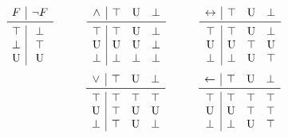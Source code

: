 \begin{table}  
\[
\begin{array}{@{\hspace{1.5mm}}c|c}
F & \neg F\\ \midrule
\top & \bot \\
\bot & \top \\
\udf & \udf \\
\end{array}
\quad\quad\quad
\begin{array}{c|ccc}
 \wedge & \top & \udf & \bot \\
\midrule
\top & \top & \udf & \bot \\
\udf & \udf & \udf & \bot \\
\bot & \bot & \bot & \bot \\
 \end{array}
\quad\quad\quad
\begin{array}{c|ccc}
  \leftrightarrow  & \top & \udf & \bot \\
  \midrule
\top & \top & \udf & \bot \\
\udf & \udf & \top & \udf\\
\bot & \bot & \udf & \top \\
 \end{array} 
 \]
 \bigskip
 \[
 \quad\quad\quad\quad\quad\quad\quad
\begin{array}{c|ccc}
 \vee & \top & \udf & \bot \\
\midrule
\top & \top & \top & \top \\
\udf & \top & \udf & \udf \\
\bot & \top & \udf & \bot \\
 \end{array}
 \quad\quad\quad
 \begin{array}{c|ccc} 
\leftarrow & \top & \udf & \bot \\
\midrule
\top & \top & \top & \top \\
\udf & \udf & \top & \top \\
\bot & \bot & \udf & \top \\
 \end{array}
\]
 \bigskip
\caption{The truth tables for the connectives under the three-valued {\L}ukasiewicz logic, where $\top$, $\bot$, and $\udf$ denote \textit{true}, \textit{false},
and \textit{unknown}, respectively.\label{table:truthtable}}
\end{table}

